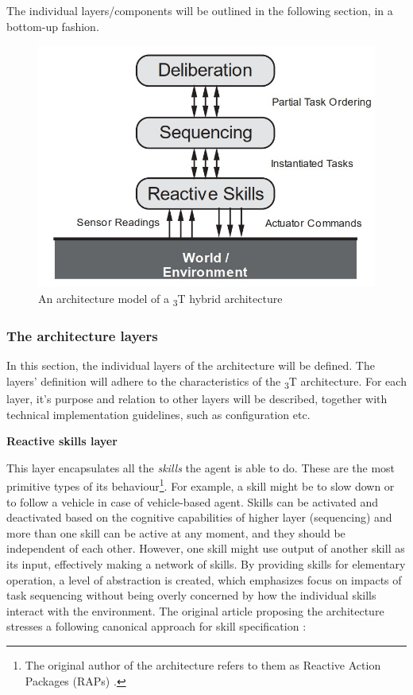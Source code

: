 \documentclass[main.tex]{subfiles}
\begin{document}
The individual layers/components will be outlined in the following section, in a bottom-up
fashion.

\begin{figure}[htbp]
    \centering
    \includegraphics[width=.8\textwidth]{3t-arch.jpg}
    \caption{An architecture model of a \textsubscript{3}T hybrid architecture \cite{Bonasso1995}}
    \label{3-arch2}
\end{figure}

\subsubsection{The architecture layers}

In this section, the individual layers of the architecture will be defined. The layers' definition will 
adhere to the characteristics of the \textsubscript{3}T architecture. For each layer, it's purpose and 
relation to other layers will be described, together with technical implementation guidelines, such as 
configuration etc.

\textbf{Reactive skills layer}

This layer encapsulates all the \emph{skills} the agent is able to do. These are the 
most primitive types of its behaviour\footnote{The original author of the architecture refers to them 
as Reactive Action Packages (RAPs) \cite{Firby1987}.}. For example, a skill might be to slow
down or to follow a vehicle in case of vehicle-based agent. Skills can be activated and deactivated based 
on the cognitive capabilities of higher layer (sequencing) and more than one skill can be active at 
any moment, and they should be independent of each other. However, one skill might use output of another 
skill as its input, effectively making a network of skills. By providing skills for elementary operation,
a level of abstraction is created, which emphasizes focus on impacts of task sequencing without being 
overly concerned by how the individual skills interact with the environment. The original article 
proposing the architecture stresses a following canonical approach for skill specification
\cite{Bonasso1995}:
\end{document}
